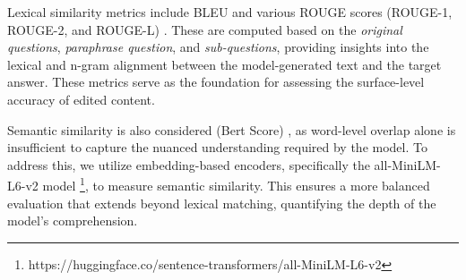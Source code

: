 Lexical similarity metrics include BLEU \cite{bleu} and various ROUGE scores (ROUGE-1, ROUGE-2, and ROUGE-L) \cite{rouge}. These are computed based on the \textit{original questions}, \textit{paraphrase question}, and \textit{sub-questions}, providing insights into the lexical and n-gram alignment between the model-generated text and the target answer. These metrics serve as the foundation for assessing the surface-level accuracy of edited content.

Semantic similarity is also considered (Bert Score) \cite{bertscore}, as word-level overlap alone is insufficient to capture the nuanced understanding required by the model. To address this, we utilize embedding-based encoders, specifically the all-MiniLM-L6-v2 model \footnote{https://huggingface.co/sentence-transformers/all-MiniLM-L6-v2}, to measure semantic similarity. This ensures a more balanced evaluation that extends beyond lexical matching, quantifying the depth of the model's comprehension.

